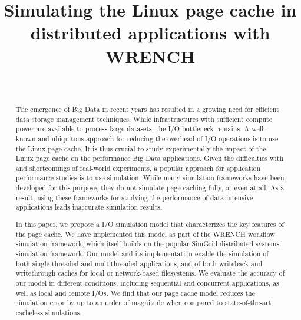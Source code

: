 \documentclass[conference]{IEEEtran}
\begin{document}
\title{Simulating the Linux page cache in distributed applications with WRENCH}

\author{\\
}

\maketitle

    \begin{abstract}

     
	The emergence of Big Data in recent years has resulted in a growing
	need for efficient data storage management techniques.  While
	infrastructures with sufficient compute power are available to
	process large datasets, the I/O bottleneck remains.  A
	well-known and ubiquitous approach for reducing the overhead of
	I/O operations is to use the Linux page cache.  It is thus crucial
	to study experimentally the impact of the Linux page cache on the
	performance Big Data applications. Given the difficulties with and shortcomings of
	real-world experiments, a popular approach for application
	performance studies is to use simulation.  While many simulation
	frameworks have been developed for this purpose, they do not 
        simulate page caching fully, or even at all.  As a result, using
	these frameworks for studying the performance of data-intensive
	applications leads inaccurate simulation results. 

	In this paper, we propose a I/O simulation model that characterizes
	the key features of the page cache. We have implemented this model
	as  part of the WRENCH workflow simulation framework, which itself
	builds on the popular SimGrid distributed systems simulation
	framework.  Our model and its implementation enable the simulation
	of both single-threaded and multithreaded applications, and of both
	writeback and writethrough caches for local or network-based
	filesystems. We evaluate the accuracy of our model in different
	conditions, including sequential and concurrent applications, as
	well as local and remote I/Os.  We find that our page cache model
	reduces the simulation error by up to an order of magnitude when
	compared to state-of-the-art, cacheless simulations.

    \end{abstract}
\end{document}
